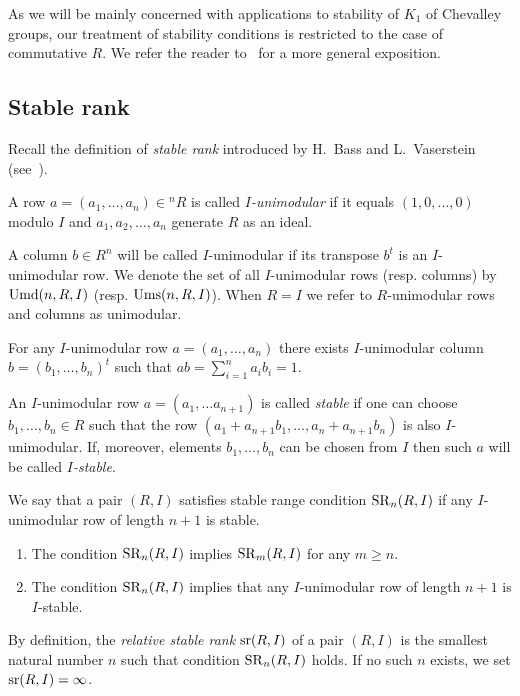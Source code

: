 As we will be mainly concerned with applications to stability of $K_1$ of Chevalley groups, our treatment of stability conditions is restricted to the case of commutative $R$. 
We refer the reader to~\cite{Ba64, Va69, Va71} for a more general exposition.

\subsection{Stable rank}
Recall the definition of \emph{stable rank} introduced by H.~Bass and L.~Vaserstein (see~\cite{Ba64, Va69}).
\begin{dfn}
A row $a=(a_1,\ldots,a_n)\in{}^n\!R$ is called \emph{$I$-unimodular} if it equals $(1,0,\ldots,0)$ modulo $I$ and $a_1,a_2,\ldots,a_n$ generate $R$ as an ideal.
\end{dfn}
A column $b \in R^n$ will be called $I$-unimodular if its transpose $b^t$ is an $I$-unimodular row. We denote the set of all $I$-unimodular rows (resp. columns) by $\operatorname{Umd}(n,R,I)$ (resp. $\operatorname{Ums}(n,R,I)$).
When $R=I$ we refer to $R$-unimodular rows and columns as unimodular.
\begin{lemma}\label{lemma:relstrlemma}
For any $I$-unimodular row $a=(a_1,\ldots,a_n)$ there exists $I$-unimodular column $b=(b_1,\ldots,b_n)^t$ such that $ab=\sum\limits_{i=1}^n a_i b_i=1$.
\end{lemma}
\begin {dfn} An $I$-unimodular row $a=(a_1,\ldots a_{n+1})$ is called \emph{stable} if one can choose $b_1,\ldots,b_n\in R$ such that the row $(a_1+a_{n+1}b_1,\ldots,a_n+a_{n+1}b_n)$ is also $I$-unimodular. If, moreover, elements $b_1,\ldots,b_n$ can be chosen from  $I$ then such $a$ will be called \emph{$I$-stable}. \end{dfn} 
We say that a pair $(R,I)$ satisfies stable range condition $\operatorname{SR}_n(R,I)$ if any $I$-unimodular row of length $n+1$ is stable.
\begin{lemma}\label{lemma:relstrlemma2}\strut
\begin{enumerate}
\item The condition $\operatorname{SR}_n(R,I)$ implies $\operatorname{SR}_m(R,I)$ for any $m\geqslant n$.
\item The condition $\operatorname{SR}_n(R,I)$ implies that any $I$-unimodular row of length $n+1$ is $I$-stable.
\end{enumerate}
\end{lemma}
By definition, the {\it relative stable rank} $\operatorname{sr}(R,I)$ of a pair $(R,I)$ is the smallest natural number $n$ such that condition $\operatorname{SR}_n(R,I)$ holds.
If no such $n$ exists, we set $\operatorname{sr}(R,I)=\infty$.

